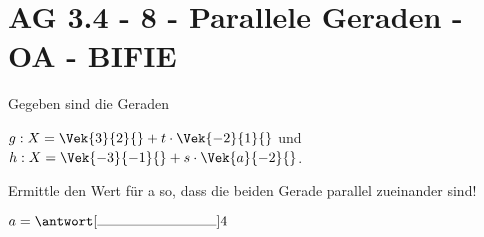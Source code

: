 \section{AG 3.4 - 8 - Parallele Geraden - OA - BIFIE}

\begin{beispiel}[AG 3.4]{1} %
Gegeben sind die Geraden
 
$g:X=\Vek{3}{2}{}+t\cdot\Vek{-2}{1}{}$ und $h:X=\Vek{-3}{-1}{}+s\cdot\Vek{a}{-2}{}$.\vspace{0,2cm}

Ermittle den Wert für a so, dass die beiden Gerade parallel zueinander sind!\leer

$a=\antwort[\rule{3cm}{0.3pt}]{4}$
\end{beispiel}